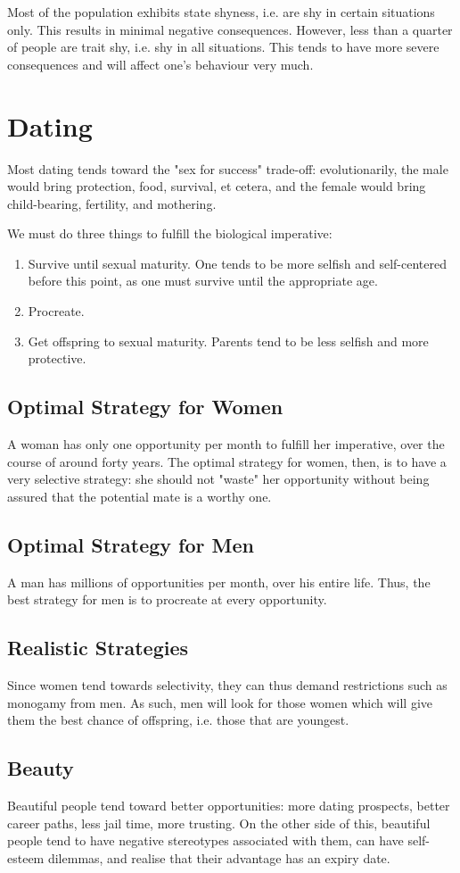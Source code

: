 \documentclass[12pt]{article}
\begin{document}
Most of the population exhibits state shyness, i.e. are shy in certain situations only. This results in minimal negative consequences. However, less than a quarter of people are trait shy, i.e. shy in all situations. This tends to have more severe consequences and will affect one's behaviour very much.

\section*{Dating}
Most dating tends toward the "sex for success" trade-off: evolutionarily, the male would bring protection, food, survival, et cetera, and the female would bring child-bearing, fertility, and mothering.

We must do three things to fulfill the biological imperative:
\begin{enumerate}
\item Survive until sexual maturity. One tends to be more selfish and self-centered before this point, as one must survive until the appropriate age.
\item Procreate.
\item Get offspring to sexual maturity. Parents tend to be less selfish and more protective.
\end{enumerate}

\subsection*{Optimal Strategy for Women}
A woman has only one opportunity per month to fulfill her imperative, over the course of around forty years. The optimal strategy for women, then, is to have a very selective strategy: she should not "waste" her opportunity without being assured that the potential mate is a worthy one.

\subsection*{Optimal Strategy for Men}
A man has millions of opportunities per month, over his entire life. Thus, the best strategy for men is to procreate at every opportunity.

\subsection*{Realistic Strategies}
Since women tend towards selectivity, they can thus demand restrictions such as monogamy from men. As such, men will look for those women which will give them the best chance of offspring, i.e. those that are youngest.

\subsection*{Beauty}
Beautiful people tend toward better opportunities: more dating prospects, better career paths, less jail time, more trusting. On the other side of this, beautiful people tend to have negative stereotypes associated with them, can have self-esteem dilemmas, and realise that their advantage has an expiry date.
\end{document}
